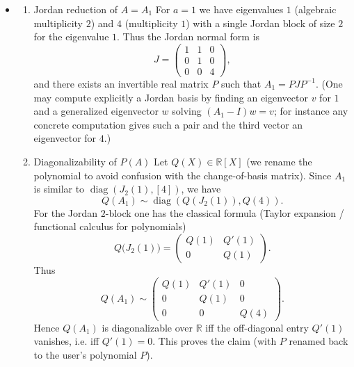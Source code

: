 \documentclass[12pt]{article}
\begin{document}
\begin{answerbox}
\begin{itemize}
\begin{enumerate}
\begin{enumerate}
                    so
                    \[A_1^k=P\begin{pmatrix}1 & k & 0\\0 & 1 & 0\\0 & 0 & 4^k\end{pmatrix}P^{-1}.\]
                \end{enumerate}
                (If desired one can compute $P$ explicitly and write $A_a^k$ as a polynomial in $A_a$ of degree $\le2$ using Cayley–Hamilton.)
        \end{enumerate}
    \item
        \begin{enumerate}
            \item Jordan reduction of $A=A_1$
            For $a=1$ we have eigenvalues $1$ (algebraic multiplicity $2$) and $4$ (multiplicity $1$) with a single Jordan block of size $2$ for the eigenvalue $1$. Thus the Jordan normal form is
            \[J=\begin{pmatrix}1 & 1 & 0\\ 0 & 1 & 0\\ 0 & 0 & 4\end{pmatrix},\]
            and there exists an invertible real matrix $P$ such that $A_1=PJP^{-1}$. (One may compute explicitly a Jordan basis by finding an eigenvector $v$ for $1$ and a generalized eigenvector $w$ solving $(A_1-I)w=v$; for instance any concrete computation gives such a pair and the third vector an eigenvector for $4$.)
            \item Diagonalizability of $P(A)$
            Let $Q(X)\in\mathbb{R}[X]$ (we rename the polynomial to avoid confusion with the change-of-basis matrix). Since $A_1$ is similar to $\operatorname{diag}(J_2(1),[4])$, we have
            \[Q(A_1)\sim \operatorname{diag}(Q(J_2(1)),Q(4)).\]
            For the Jordan $2$-block one has the classical formula (Taylor expansion / functional calculus for polynomials)
            \[Q\bigl(J_2(1)\bigr)=\begin{pmatrix}Q(1) & Q'(1)\\[2pt]0 & Q(1)\end{pmatrix}.\]
            Thus
            \[Q(A_1)\sim \begin{pmatrix}Q(1) & Q'(1) & 0\\[2pt]0 & Q(1) & 0\\[2pt]0 & 0 & Q(4)\end{pmatrix}.\]
            Hence $Q(A_1)$ is diagonalizable over $\mathbb{R}$ iff the off-diagonal entry $Q'(1)$ vanishes, i.e. iff $Q'(1)=0$. This proves the claim (with $P$ renamed back to the user's polynomial $P$).
        \end{enumerate}
\end{itemize}

\end{answerbox}
\end{document}
